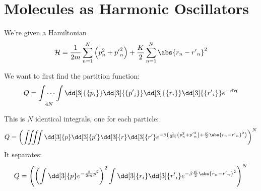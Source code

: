 \documentclass[../../PS3.tex]{subfiles}
\begin{document}
\section{Molecules as Harmonic Oscillators}

We're given a Hamiltonian 
\begin{equation}
	\ham = \frac{1}{2m} \sum_{n = 1}^N \left(p_n^2 + {p'}_n^2\right) + \frac{K}{2} \sum_{n = 1}^{N} \abs{r_n - {r'}_n}^2 
\end{equation}

We want to first find the partition function:
\begin{align}
	Q = \idotsint\limits_{4N} \dd[3]{\{p_i\}} \dd[3]{\{{p'}_i\}} \dd[3]{\{r_i\}} \dd[3]{\{{r'}_i\}} e^{-\beta \ham}
\end{align}

This is $N$ identical integrals, one for each particle:
\begin{align}
	Q = \left(\iiiint \dd[3]{p} \dd[3]{{p'}} \dd[3]{r} \dd[3]{{r'}} e^{-\beta \left( \frac{1}{2m}  \left(p_n^2 + {p'}_n^2\right) + \frac{K}{2} \abs{r_n - {r'}_n}^2 \right)}\right) ^N
\end{align}
It separates:
\begin{align} \label{eq:prob3a:separatedA}
	Q = \left(\left(\int \dd[3]{p} e^{-\frac{\beta}{2m} p^2}\right)^2  \int \dd[3]{r_i} \dd[3]{{r'}_i} e^{-\beta \frac{K}{2} \abs{r_n - {r'}_n}^2 }\right) ^N
\end{align}
\end{document}
